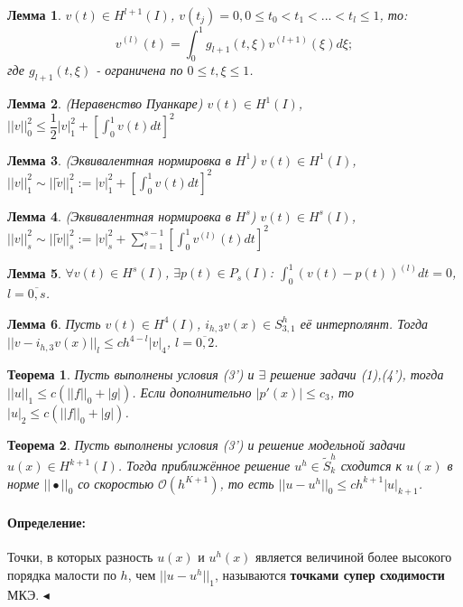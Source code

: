 \documentclass{article}
\newtheorem{theorem}{Теорема}
\newtheorem{lemma}{Лемма}
\newenvironment{definition}{ \paragraph{Определение:}}{\hfill $\blacktriangleleft$}
\begin{document}
\begin{lemma}
	$v(t) \in H^{l+1}(I)$, $v(t_j) = 0, 0 \leqslant t_0 < t_1 < ... < t_l \leqslant 1$, то:
	\[
	v^{(l)}(t) = \int_0^1 g_{l+1}(t,\xi) v^{(l+1)}(\xi) d\xi;
	\]
	где $g_{l+1}(t,\xi)$ - ограничена по $ 0 \leqslant t,\xi \leqslant 1 $.
\end{lemma}

\begin{lemma}
	(Неравенство Пуанкаре)
	$v(t) \in H^1(I)$, $||v||_0^2 \leqslant \dfrac{1}{2} |v|_1^2 + [\int_0^1 v(t) dt]^2$
\end{lemma}

\begin{lemma}
	(Эквивалентная нормировка в $H^1$)
	$v(t) \in H^1(I)$, $||v||_1^2 \sim ||\tilde{v}||_1^2 := |v|_1^2 + [\int_0^1 v(t) dt]^2$
\end{lemma}

\begin{lemma}
	(Эквивалентная нормировка в $H^s$)
	$v(t) \in H^s(I)$, $||v||_s^2 \sim ||\tilde{v}||_s^2 := |v|_s^2 + \sum_{l = 1}^{s-1} [\int_0^1 v^{(l)}(t) dt]^2$
\end{lemma}


\begin{lemma}
	$\forall v(t) \in H^s(I)$, $\exists p(t) \in P_s(I)$: $\int_0^1 (v(t) - p(t))^{(l)} dt = 0$, $l = \overline{0,s}$.
\end{lemma}

\begin{lemma}
	Пусть $v(t) \in H^4(I)$, $i_{h,3} v(x) \in S_{3,1}^h $ её интерполянт. Тогда $||v - i_{h,3} v(x)||_l \leqslant c h^{4-l} |v|_4$, $l = \overline{0,2}$.
\end{lemma}


\begin{theorem}
	Пусть выполнены условия (3') и $\exists$ решение задачи (1),(4'), тогда $||u||_1 \leqslant c (||f||_0 + |g|)$. Если дополнительно $|p'(x)| \leqslant c_3$, то $|u|_2 \leqslant c (||f||_0 + |g|)$.
\end{theorem}

\begin{theorem}
	Пусть выполнены условия (3') и решение модельной задачи $u(x) \in H^{k+1} (I)$. Тогда приближённое решение $u^h \in \tilde{S}_k^h$ сходится к $u(x)$ в норме $||\bullet||_0$ со скоростью $\mathcal{O}(h^{K+1})$, то есть $||u - u^h||_0 \leqslant c h^{k+1} |u|_{k+1}$.
\end{theorem}

\begin{definition}
	Точки, в которых разность $u(x)$ и $u^{h}(x)$ является величиной более высокого порядка малости по $h$, чем $||u - u^h||_1$, называются \textbf{точками супер сходимости} МКЭ.
\end{definition}
\end{document}

